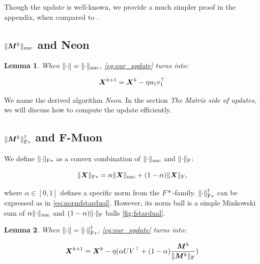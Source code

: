 \documentclass{article} %
\newtheorem{lemma}{Lemma}
\newcommand{\norm}[1]{\lVert #1\rVert}
\DeclarePairedDelimiter{\normf}{\|}{\|_\mathrm{F}}
\DeclarePairedDelimiter{\normfstar}{\|}{\|_\mathrm{F*}}
\DeclarePairedDelimiter{\normn}{\|}{\|_{\mathrm{nuc}}}
\begin{document}
    Though the update is well-known, we provide a much simpler proof in the appendix, when compared to \citet{bernstein2024oldoptimizernewnorm}.

    \subsection{\texorpdfstring{$\normn{\mM^{k}}$ and Neon}{Neon}}
    \begin{lemma}\label{lemma:neon_update}
        When $\norm{\cdot} = \normn{\cdot}$, \cref{eq:our_update} turns into:

        \begin{equation}\label{eq:neon_update}
            {\bm{X}}^{k+1} = {\bm{X}}^{k} - \eta u_1 v_1^\top
        \end{equation}
    \end{lemma}
        We name the derived algorithm \emph{Neon}. In the section {\it The Matrix side of updates}, we will discuss how to compute the update efficiently.

    \subsection{\texorpdfstring{$\normfstar{\mM^{k}}^\dagger$ and F-Muon}{F-Muon}}
        We define $\normfstar{\cdot}$ as a convex combination of $\normn{\cdot}$ and $\normf{\cdot}$:

        \begin{equation}\label{eq:fstar_norm}
            \normfstar{\mX} = \alpha \normn{\mX} + (1-\alpha)\normf{\mX},
        \end{equation}

        where $\alpha \in [0, 1]$ defines a specific norm from the $F*$-family. $\normfstar{\cdot}^\dagger$ can be expressed as in \cref{eq:normfstardual}. However, its norm ball is a simple Minkowski sum of $\alpha \normn{\cdot}$ and $(1-\alpha)\normf{\cdot}$ balls \cref{fig:fstardual}.

    \begin{lemma}\label{lemma:nsgd_muon_update}
        When $\norm{\cdot} = \normfstar{\cdot}^\dagger$, \cref{eq:our_update} turns into:

        \begin{equation}\label{eq:nsgd_muon_update}
            \mX^{k+1} = \mX^{k} - \eta (\alpha U V^\top + (1-\alpha)\frac{\mM^k}{\normf{\mM^k}})
        \end{equation}
    \end{lemma}
\end{document}
